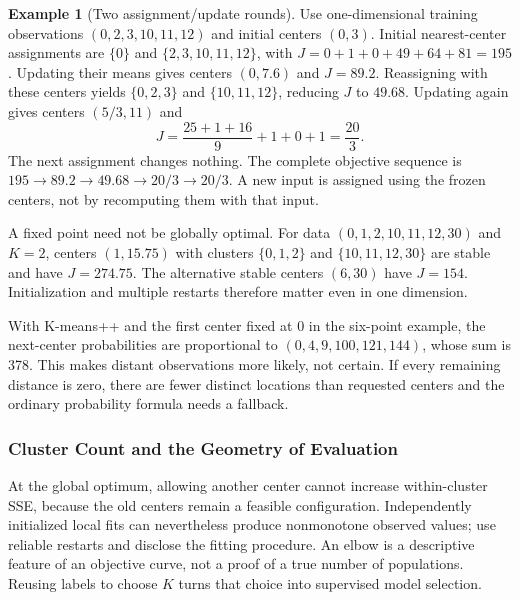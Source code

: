 \documentclass[11pt,twoside]{article}
\numberwithin{equation}{section}
\theoremstyle{plain}
\theoremstyle{definition}
\newtheorem{example}[theorem]{Example}
\theoremstyle{remark}
\begin{document}
\begin{example}[Two assignment/update rounds]
Use one-dimensional training observations $(0,2,3,10,11,12)$ and initial centers $(0,3)$. Initial nearest-center assignments are $\{0\}$ and $\{2,3,10,11,12\}$, with
$J=0+1+0+49+64+81=195$. Updating their means gives centers $(0,7.6)$ and $J=89.2$. Reassigning with these centers yields $\{0,2,3\}$ and $\{10,11,12\}$, reducing $J$ to $49.68$. Updating again gives centers $(5/3,11)$ and
\[
J=\frac{25+1+16}{9}+1+0+1=\frac{20}{3}.
\]
The next assignment changes nothing. The complete objective sequence is $195\to89.2\to49.68\to20/3\to20/3$. A new input is assigned using the frozen centers, not by recomputing them with that input.
\end{example}

A fixed point need not be globally optimal. For data $(0,1,2,10,11,12,30)$ and $K=2$, centers $(1,15.75)$ with clusters $\{0,1,2\}$ and $\{10,11,12,30\}$ are stable and have $J=274.75$. The alternative stable centers $(6,30)$ have $J=154$. Initialization and multiple restarts therefore matter even in one dimension.

With K-means++ and the first center fixed at 0 in the six-point example, the next-center probabilities are proportional to $(0,4,9,100,121,144)$, whose sum is 378. This makes distant observations more likely, not certain. If every remaining distance is zero, there are fewer distinct locations than requested centers and the ordinary probability formula needs a fallback.

\subsubsection{Cluster Count and the Geometry of Evaluation}
At the global optimum, allowing another center cannot increase within-cluster SSE, because the old centers remain a feasible configuration. Independently initialized local fits can nevertheless produce nonmonotone observed values; use reliable restarts and disclose the fitting procedure. An elbow is a descriptive feature of an objective curve, not a proof of a true number of populations. Reusing labels to choose $K$ turns that choice into supervised model selection.
\end{document}
